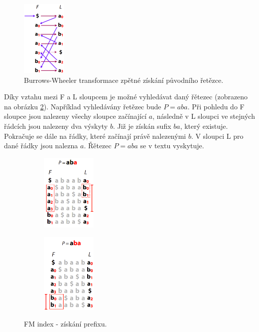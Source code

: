 \documentclass[czech,DP]{thesiskiv}
\numberwithin{equation}{section}
\begin{document}
\begin{figure}[H]		
		\centering
		\includegraphics[width=80px]{./img/BWT_3.png}
		\caption{Burrows-Wheeler transformace zpětné získání původního řetězce. \cite{bw_transform}}
		\label{fig:bw_transform_inverse}
\end{figure}

\noindent
Díky vztahu mezi F a L sloupcem je možné vyhledávat daný řětezec (zobrazeno na obrázku \ref{fig:fm_index}). Například vyhledávány řetězec bude $P = aba$. Při pohledu do F sloupce jsou nalezeny všechy sloupce začínající $a$, následně v L sloupci ve stejných řádcích jsou nalezeny dva výskyty $b$. Již je získán sufix $ba$, který existuje. Pokračuje se dále na řádky, které začínají právě nalezenými $b$. V sloupci L pro dané řádky jsou nalezna $a$. Řětezec $P = aba$ se v textu vyskytuje. 

\begin{figure}[H]
		\centering
		\begin{subfigure}[t]{.4\textwidth}
			\centering
			\includegraphics[width=100px]{./img/FM_index_1.png}
		\end{subfigure}
		\begin{subfigure}[t]{.4\textwidth}
			\centering
			\includegraphics[width=100px]{./img/FM_index_2.png}
		\end{subfigure}	
		\caption{FM index - získání prefixu. \cite{bw_transform}}
		\label{fig:fm_index}
\end{figure}
\end{document}
